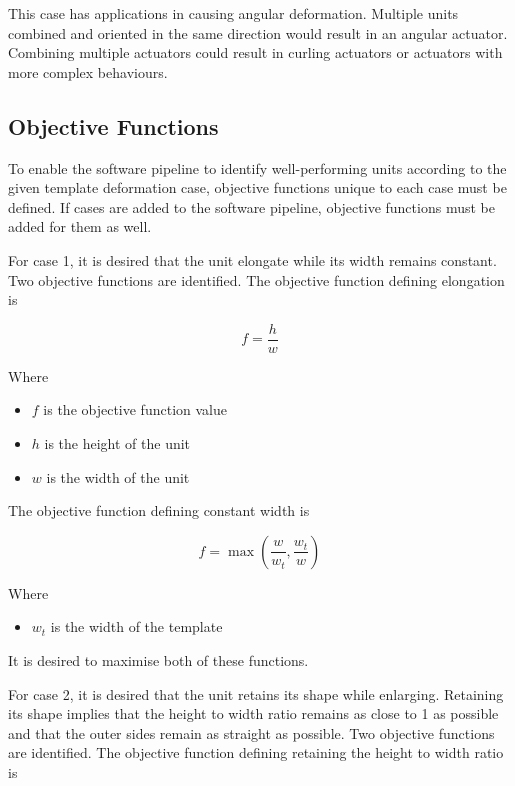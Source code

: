 This case has applications in causing angular deformation. Multiple units combined and oriented in the same direction would result in an angular actuator. Combining multiple actuators could result in curling actuators or actuators with more complex behaviours.

\subsection{Objective Functions}

To enable the software pipeline to identify well-performing units according to the given template deformation case, objective functions unique to each case must be defined. If cases are added to the software pipeline, objective functions must be added for them as well.

For case 1, it is desired that the unit elongate while its width remains constant. Two objective functions are identified. The objective function defining elongation is

\begin{equation}
	f=\frac{h}{w}
\end{equation}

Where

\begin{itemize}
	\item $f$ is the objective function value
	\item $h$ is the height of the unit
	\item $w$ is the width of the unit
\end{itemize}

The objective function defining constant width is

\begin{equation}
	f=\max\left (\frac{w}{w_{t}},\frac{w_{t}}{w} \right )
\end{equation}

Where

\begin{itemize}
	\item $w_{t}$ is the width of the template
\end{itemize}

It is desired to maximise both of these functions.

For case 2, it is desired that the unit retains its shape while enlarging. Retaining its shape implies that the height to width ratio remains as close to 1 as possible and that the outer sides remain as straight as possible. Two objective functions are identified. The objective function defining retaining the height to width ratio is


